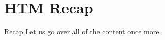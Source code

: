 \section{HTM Recap}

\begin{frame}[c]{Recap}
    Let us go over all of the content once more.
\end{frame}


